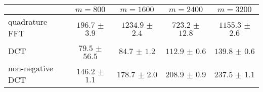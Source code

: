 \centering
\renewcommand{\arraystretch}{1.2}
\begin{tabular}{@{}lcccc@{}}
\toprule
 & $m=800$ & $m=1600$ & $m=2400$ & $m=3200$\\
\midrule
quadrature FFT & $196.7$ $\pm$ $3.9$ & $1234.9$ $\pm$ $2.4$ & $723.2$ $\pm$ $12.8$ & $1155.3$ $\pm$ $2.6$ \\
DCT & $79.5$ $\pm$ $56.5$ & $84.7$ $\pm$ $1.2$ & $112.9$ $\pm$ $0.6$ & $139.8$ $\pm$ $0.6$ \\
non-negative DCT & $146.2$ $\pm$ $1.1$ & $178.7$ $\pm$ $2.0$ & $208.9$ $\pm$ $0.9$ & $237.5$ $\pm$ $1.1$ \\
\bottomrule
\end{tabular}
